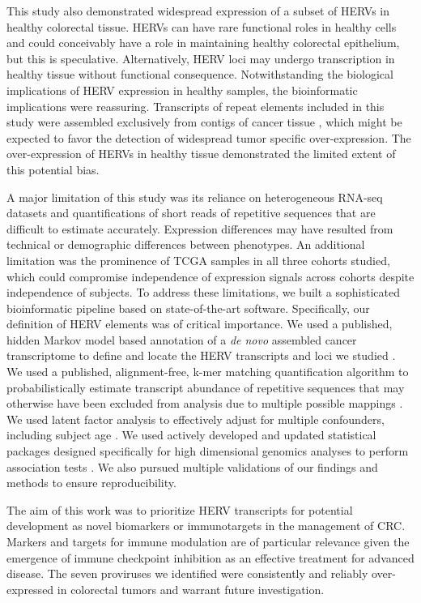 This study also demonstrated widespread expression of a subset of HERVs in healthy colorectal tissue.
HERVs can have rare functional roles in healthy cells \citep{Rote2004} and could conceivably have a role in maintaining healthy colorectal epithelium, but this is speculative.
Alternatively, HERV loci may undergo transcription in healthy tissue without functional consequence.
Notwithstanding the biological implications of HERV expression in healthy samples, the bioinformatic implications were reassuring.
Transcripts of repeat elements included in this study were assembled exclusively from contigs of cancer tissue \citep{Attig2019}, which might be expected to favor the detection of widespread tumor specific over-expression.
The over-expression of HERVs in healthy tissue demonstrated the limited extent of this potential bias.

A major limitation of this study was its reliance on heterogeneous RNA-seq datasets and quantifications of short reads of repetitive sequences that are difficult to estimate accurately.
Expression differences may have resulted from technical or demographic differences between phenotypes.
An additional limitation was the prominence of TCGA samples in all three cohorts studied, which could compromise independence of expression signals across cohorts despite independence of subjects.
To address these limitations, we built a sophisticated bioinformatic pipeline based on state-of-the-art software.
Specifically, our definition of HERV elements was of critical importance.
We used a published, hidden Markov model based annotation of a \emph{de novo} assembled cancer transcriptome to define and locate the HERV transcripts and loci we studied \citep{Attig2019}.
We used a published, alignment-free, k-mer matching quantification algorithm to probabilistically estimate transcript abundance of repetitive sequences that may otherwise have been excluded from analysis due to multiple possible mappings \citep{Patro2017}.
We used latent factor analysis to effectively adjust for multiple confounders, including subject age \citep{sva}.
We used actively developed and updated statistical packages designed specifically for high dimensional genomics analyses to perform association tests \citep{Love2014, sva}.
We also pursued multiple validations of our findings and methods to ensure reproducibility.

The aim of this work was to prioritize HERV transcripts for potential development as novel biomarkers or immunotargets in the management of CRC.
Markers and targets for immune modulation are of particular relevance given the emergence of immune checkpoint inhibition as an effective treatment for advanced disease.
The seven proviruses we identified were consistently and reliably over-expressed in colorectal tumors and warrant future investigation.

